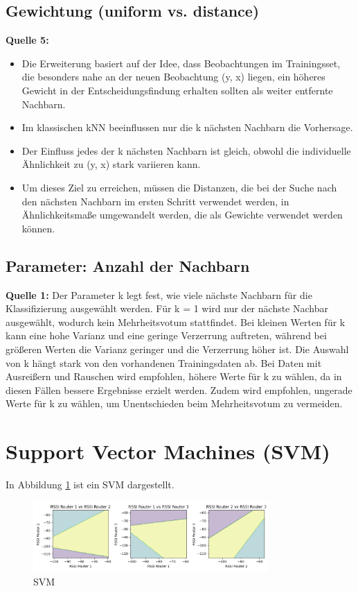 \subsection{Gewichtung (uniform vs. distance)}
\textbf{Quelle 5:}
\begin{itemize}
    \item Die Erweiterung basiert auf der Idee, dass Beobachtungen im Trainingsset, die besonders nahe an der neuen Beobachtung (y, x) liegen, ein höheres Gewicht in der Entscheidungsfindung erhalten sollten als weiter entfernte Nachbarn.
    \item Im klassischen kNN beeinflussen nur die k nächsten Nachbarn die Vorhersage.
    \item Der Einfluss jedes der k nächsten Nachbarn ist gleich, obwohl die individuelle Ähnlichkeit zu (y, x) stark variieren kann.
    \item Um dieses Ziel zu erreichen, müssen die Distanzen, die bei der Suche nach den nächsten Nachbarn im ersten Schritt verwendet werden, in Ähnlichkeitsmaße umgewandelt werden, die als Gewichte verwendet werden können.
\end{itemize}

\subsection{Parameter: Anzahl der Nachbarn}
\textbf{Quelle 1:} Der Parameter k legt fest, wie viele nächste Nachbarn für die Klassifizierung ausgewählt werden. Für k = 1 wird nur der nächste Nachbar ausgewählt, wodurch kein Mehrheitsvotum stattfindet. Bei kleinen Werten für k kann eine hohe Varianz und eine geringe Verzerrung auftreten, während bei größeren Werten die Varianz geringer und die Verzerrung höher ist. Die Auswahl von k hängt stark von den vorhandenen Trainingsdaten ab. Bei Daten mit Ausreißern und Rauschen wird empfohlen, höhere Werte für k zu wählen, da in diesen Fällen bessere Ergebnisse erzielt werden. Zudem wird empfohlen, ungerade Werte für k zu wählen, um Unentschieden beim Mehrheitsvotum zu vermeiden.

\section{Support Vector Machines (SVM)}


In Abbildung \ref{fig:myplot_7_svm} ist ein SVM dargestellt.

\begin{figure}[H]
    \centering
    \includegraphics[width=0.8\textwidth]{images/myplot_7_svm.png}
    \caption{SVM}
    \label{fig:myplot_7_svm}
\end{figure}

